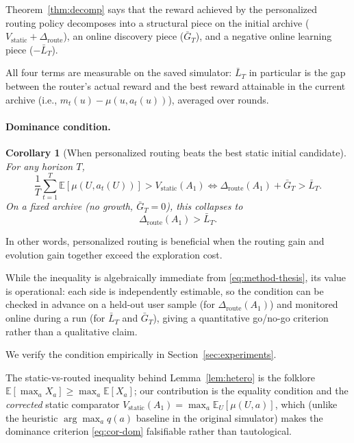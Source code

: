 \documentclass{article} %
\newtheorem{corollary}[theorem]{Corollary}
\providecommand{\E}{\mathbb{E}}
\begin{document}
Theorem~\ref{thm:decomp} says that the reward achieved by the personalized routing policy decomposes into a structural piece on the initial archive ($V_{\mathrm{static}}+\Delta_{\mathrm{route}}$), an online discovery piece ($\bar G_T$), and a negative online learning piece ($-\bar L_T$).

All four terms are measurable on the saved simulator: $\bar L_T$ in particular is the gap between the router's actual reward and the best reward attainable in the current archive (i.e., $m_t(u) - \mu(u, a_t(u))$), averaged over rounds.

\paragraph{Dominance condition.}

\label{sec:method-cor-dom}

\begin{corollary}[When personalized routing beats the best static initial candidate]
\label{cor:dominance}
For any horizon $T$,
\begin{equation}
\label{eq:cor-dom}
\frac{1}{T}\sum_{t=1}^T \E[\mu(U, a_t(U))] > V_{\mathrm{static}}(A_1)
\iff
\Delta_{\mathrm{route}}(A_1) + \bar G_T > \bar L_T.
\end{equation}
On a fixed archive (no growth, $\bar G_T = 0$), this collapses to
\begin{equation}
\label{eq:cor-dom-fixed}
\Delta_{\mathrm{route}}(A_1) > \bar L_T.
\end{equation}
\end{corollary}

In other words, personalized routing is beneficial when the routing gain and evolution gain together exceed the exploration cost.

While the inequality is algebraically immediate from \eqref{eq:method-thesis}, its value is operational: each side is independently estimable, so the condition can be checked in advance on a held-out user sample (for $\Delta_{\mathrm{route}}(A_1)$) and monitored online during a run (for $\bar L_T$ and $\bar G_T$), giving a quantitative go/no-go criterion rather than a qualitative claim.

We verify the condition empirically in Section~\ref{sec:experiments}.

The static-vs-routed inequality behind Lemma~\ref{lem:hetero} is the folklore $\E[\max_a X_a]\ge\max_a\E[X_a]$; our contribution is the equality condition and the \emph{corrected} static comparator $V_{\mathrm{static}}(A_1)=\max_a\E_U[\mu(U,a)]$, which (unlike the heuristic $\arg\max_a q(a)$ baseline in the original simulator) makes the dominance criterion \eqref{eq:cor-dom} falsifiable rather than tautological.
\end{document}
